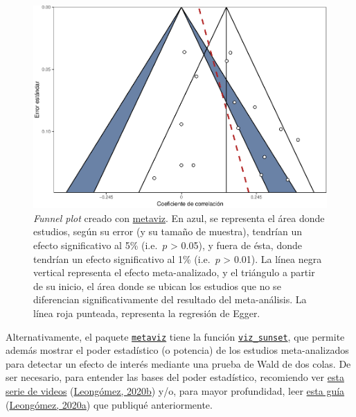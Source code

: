 \documentclass[
  bookmarksnumbered]{article}
\begin{document}
\begin{figure}
\centering
\includegraphics{Meta-analysis_files/figure-latex/funnel-plot2-1.pdf}
\caption{\label{fig:funnel-plot2}\emph{Funnel plot} creado con \href{https://cran.r-project.org/web/packages/metaviz/vignettes/metaviz.html}{metaviz}. En azul, se representa el área donde estudios, según su error (y su tamaño de muestra), tendrían un efecto significativo al 5\% (i.e.~\(p\) \textgreater{} 0.05), y fuera de ésta, donde tendrían un efecto significativo al 1\% (i.e.~\(p\) \textgreater{} 0.01). La línea negra vertical representa el efecto meta-analizado, y el triángulo a partir de su inicio, el área donde se ubican los estudios que no se diferencian significativamente del resultado del meta-análisis. La línea roja punteada, representa la regresión de Egger.}
\end{figure}

Alternativamente, el paquete \href{https://cran.r-project.org/web/packages/metaviz/vignettes/metaviz.html}{\texttt{metaviz}} tiene la función \href{https://cran.r-project.org/web/packages/metaviz/vignettes/metaviz.html\#sunset-power-enhanced-funnel-plots}{\texttt{viz\_sunset}}, que permite además mostrar el poder estadístico (o potencia) de los estudios meta-analizados para detectar un efecto de interés mediante una prueba de Wald de dos colas. De ser necesario, para entender las bases del poder estadístico, recomiendo ver \href{https://youtube.com/playlist?list\%20=\%20PLHk7UNt35ccVdyHqnQ6oXVYA6JBNFrE1x}{esta serie de videos} (\protect\hyperlink{ref-leongomezPoderRvid2020}{Leongómez, 2020b}) y/o, para mayor profundidad, leer \href{https://doi.org/10.5281/zenodo.3988776}{esta guía} (\protect\hyperlink{ref-leongomezAnalisisPoderEstadistico2020}{Leongómez, 2020a}) que publiqué anteriormente.
\end{document}

